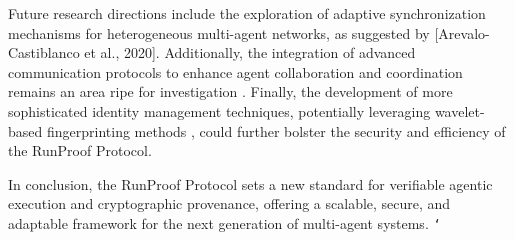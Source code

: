 \documentclass[11pt]{article}
\begin{document}
Future research directions include the exploration of adaptive synchronization mechanisms for heterogeneous multi-agent networks, as suggested by [Arevalo-Castiblanco et al., 2020]. Additionally, the integration of advanced communication protocols to enhance agent collaboration and coordination remains an area ripe for investigation \cite{Zhu2022}. Finally, the development of more sophisticated identity management techniques, potentially leveraging wavelet-based fingerprinting methods \cite{Shore2025}, could further bolster the security and efficiency of the RunProof Protocol.

In conclusion, the RunProof Protocol sets a new standard for verifiable agentic execution and cryptographic provenance, offering a scalable, secure, and adaptable framework for the next generation of multi-agent systems.
\texttt{`}





\end{document}
